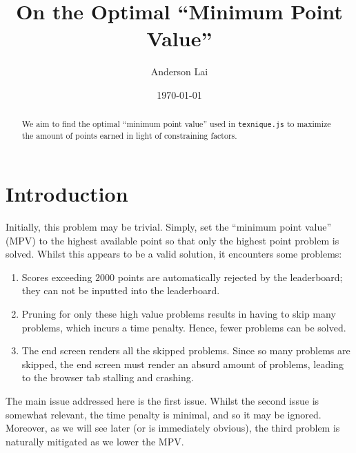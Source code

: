 \documentclass{article}
\author{Anderson Lai}
\title{On the Optimal ``Minimum Point Value''}
\date{\today}
\begin{document}
\maketitle

\begin{abstract}
    We aim to find the optimal ``minimum point value'' used in \verb|texnique.js| to maximize the amount of points earned in light of constraining factors.
\end{abstract}

\section{Introduction}
Initially, this problem may be trivial. Simply, set the ``minimum point value'' (MPV) to the highest available point so that only the highest point problem is solved. Whilst this appears to be a valid solution, it encounters some problems:
\begin{enumerate}
    \item Scores exceeding $2000$ points are automatically rejected by the leaderboard; they can not be inputted into the leaderboard.
    \item Pruning for only these high value problems results in having to skip many problems, which incurs a time penalty. Hence, fewer problems can be solved.
    \item The end screen renders all the skipped problems. Since so many problems are skipped, the end screen must render an absurd amount of problems, leading to the browser tab stalling and crashing.
\end{enumerate}
The main issue addressed here is the first issue. Whilst the second issue is somewhat relevant, the time penalty is minimal, and so it may be ignored. Moreover, as we will see later (or is immediately obvious), the third problem is naturally mitigated as we lower the MPV.
\end{document}

